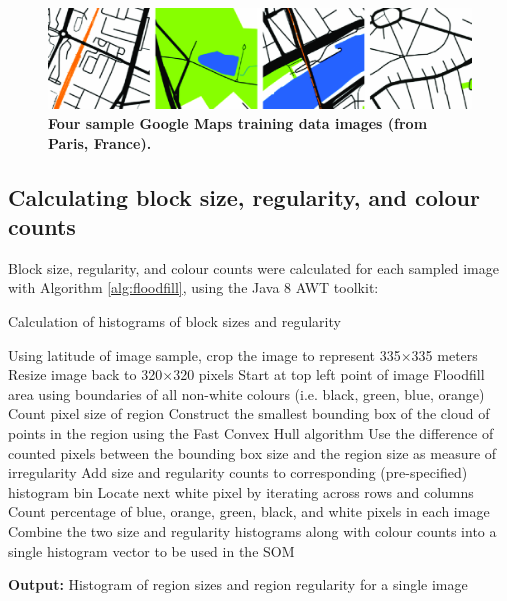 \documentclass[9pt,twocolumn,twoside,lineno]{pnas-new}
\begin{document}
{\begin{figure}
\centering
\includegraphics[width=.8\linewidth]{BlockTypologies_Figures2-4.png}
\caption{\bf Four sample Google Maps training data images (from Paris, France)\cite{GoogleStatic2017}.}
 \label{fig:maps}
\end{figure} 

\subsection*{Calculating block size, regularity, and colour counts}\label{methodscalc}

Block size, regularity, and colour counts were calculated for each sampled image with Algorithm \ref{alg:floodfill}, using the Java 8 AWT toolkit\cite{Oracle2018}:

\begin{algorithm}
  \caption{Calculation of histograms of block sizes and regularity}
\begin{algorithmic}
\label{alg:floodfill}
\State Using latitude of image sample, crop the image to represent 335$\times$335 meters
\State Resize image back to 320$\times$320 pixels
\State Start at top left point of image
  \State Floodfill area using boundaries of all non-white colours (i.e. black, green, blue, orange)
  \State Count pixel size of region
  \State Construct the smallest bounding box of the cloud of points in the region using the Fast Convex Hull algorithm\cite{Javagl2017,GoogleArchive2011}
  \State Use the difference of counted pixels between the bounding box size and the region size as measure of irregularity
  \State Add size and regularity counts to corresponding (pre-specified) histogram bin
  \State Locate next white pixel by iterating across rows and columns
\EndWhile
\State  Count percentage of blue, orange, green, black, and white pixels in each image
\State  Combine the two size and regularity histograms along with colour counts into a single histogram vector to be used in the SOM
\end{algorithmic}
  \hspace*{\algorithmicindent} \textbf{Output:} Histogram of region sizes and region regularity for a single image
\end{algorithm}


}
\end{document}
